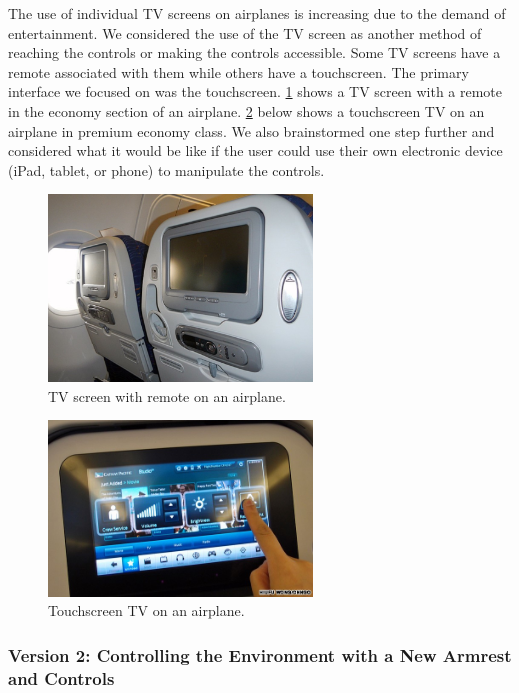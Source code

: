 The use of individual TV screens on airplanes is increasing due to the demand of entertainment.  We considered the use of the TV screen as another method of reaching the controls or making the controls accessible. Some TV screens have a remote associated with them while others have a touchscreen.  The primary interface we focused on was the touchscreen.  \ref{fig:TVScreenwithRemote.jpg} shows a TV screen with a remote in the economy section of an airplane.  \ref{fig:TouchscreenTV.jpg} below shows a touchscreen TV on an airplane in premium economy class. We also brainstormed one step further and considered what it would be like if the user could use their own electronic device (iPad, tablet, or phone) to manipulate the controls.

\begin{figure}[h]
  \centering
     \includegraphics[width=7cm]{images/TVScreenwithRemote.jpg}
   \caption{TV screen with remote on an airplane. \cite{TVremote}}
  \label{fig:TVScreenwithRemote.jpg}
\end{figure}

\begin{figure}[h]
  \centering
     \includegraphics[width=7cm]{images/TouchscreenTV.jpg}
   \caption{Touchscreen TV on an airplane. \cite{touchscreen} }
  \label{fig:TouchscreenTV.jpg}
\end{figure}

\subsubsection*{Version 2: Controlling the Environment with a New Armrest and Controls}

